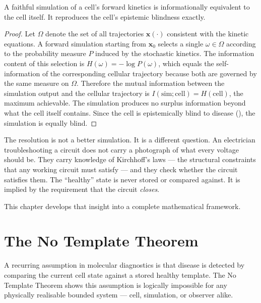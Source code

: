 \begin{proposition}
\label{prop:simulation-fails}
A faithful simulation of a cell's forward kinetics is informationally
equivalent to the cell itself.  It reproduces the cell's epistemic
blindness exactly.
\end{proposition}

\begin{proof}
Let $\Omega$ denote the set of all trajectories $\mathbf{x}(\cdot)$
consistent with the kinetic equations.  A forward simulation starting
from $\mathbf{x}_0$ selects a single $\omega \in \Omega$ according to the
probability measure $P$ induced by the stochastic kinetics.  The
information content of this selection is
$H(\omega) = -\log P(\omega)$, which equals the self-information of the
corresponding cellular trajectory because both are governed by the same
measure on $\Omega$.  Therefore the mutual information between the
simulation output and the cellular trajectory is
$I(\mathrm{sim}; \mathrm{cell}) = H(\mathrm{cell})$,
the maximum achievable.  The simulation produces no surplus information
beyond what the cell itself contains.  Since the cell is epistemically
blind to disease (), the simulation is equally
blind.
\end{proof}

The resolution is not a better simulation.  It is a different question.
An electrician troubleshooting a circuit does not carry a photograph of
what every voltage should be.  They carry knowledge of Kirchhoff's
laws --- the structural constraints that any working circuit must satisfy ---
and they check whether the circuit satisfies them.  The ``healthy'' state is
never stored or compared against.  It is implied by the requirement that
the circuit \emph{closes}.

This chapter develops that insight into a complete mathematical framework.

\section{The No Template Theorem}
\label{sec:no-template}

A recurring assumption in molecular diagnostics is that disease is detected
by comparing the current cell state against a stored healthy template.
The No Template Theorem shows this assumption is logically impossible for
any physically realisable bounded system --- cell, simulation, or observer
alike.

